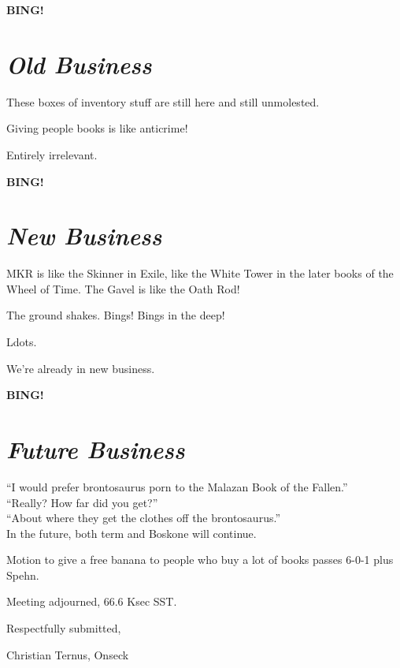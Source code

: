 \documentclass[10pt]{article}
\newcommand{\bing}{{\bf BING!} }
\newcommand{\goto}[1]{\bing \vskip 12pt \section*{{\em{#1}}}}
\newcommand{\ps}{ plus Spehn\xspace}
\begin{document}
\goto{Old Business}

These boxes of inventory stuff are still here and still unmolested.

Giving people books is like anticrime!

Entirely irrelevant.

\goto{New Business}

MKR is like the Skinner in Exile, like the White Tower in the later
books of the Wheel of Time.  The Gavel is like the Oath Rod!

The ground shakes.  Bings!  Bings in the deep!

Ldots.

We're already in new business.

\goto{Future Business}

``I would prefer brontosaurus porn to the Malazan Book of the Fallen.''\\
``Really?  How far did you get?''\\
``About where they get the clothes off the brontosaurus.''\\

In the future, both term and Boskone will continue.

Motion to give a free banana to people who buy a lot of books passes 6-0-1\ps.

\noindent
Meeting adjourned, 66.6 Ksec SST.

\vspace{18pt}

\centerline{Respectfully submitted,}
\centerline{Christian Ternus, Onseck}
\end{document}
